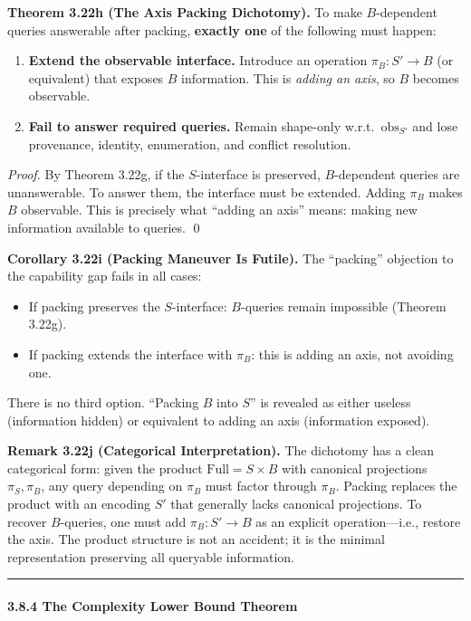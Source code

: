 \textbf{Theorem 3.22h (The Axis Packing Dichotomy).} To make $B$-dependent queries answerable after packing, \textbf{exactly one} of the following must happen:
\begin{enumerate}
\item \textbf{Extend the observable interface.} Introduce an operation $\pi_B : S' \to B$ (or equivalent) that exposes $B$ information. This is \emph{adding an axis}, so $B$ becomes observable.
\item \textbf{Fail to answer required queries.} Remain shape-only w.r.t.\ $\text{obs}_{S'}$ and lose provenance, identity, enumeration, and conflict resolution.
\end{enumerate}

\emph{Proof.} By Theorem 3.22g, if the $S$-interface is preserved, $B$-dependent queries are unanswerable. To answer them, the interface must be extended. Adding $\pi_B$ makes $B$ observable. This is precisely what ``adding an axis'' means: making new information available to queries. \qed

\textbf{Corollary 3.22i (Packing Maneuver Is Futile).} The ``packing'' objection to the capability gap fails in all cases:
\begin{itemize}
\item If packing preserves the $S$-interface: $B$-queries remain impossible (Theorem 3.22g).
\item If packing extends the interface with $\pi_B$: this is adding an axis, not avoiding one.
\end{itemize}

There is no third option. ``Packing $B$ into $S$'' is revealed as either useless (information hidden) or equivalent to adding an axis (information exposed).

\textbf{Remark 3.22j (Categorical Interpretation).} The dichotomy has a clean categorical form: given the product $\text{Full} = S \times B$ with canonical projections $\pi_S, \pi_B$, any query depending on $\pi_B$ must factor through $\pi_B$. Packing replaces the product with an encoding $S'$ that generally lacks canonical projections. To recover $B$-queries, one must add $\pi_B : S' \to B$ as an explicit operation---i.e., restore the axis. The product structure is not an accident; it is the minimal representation preserving all queryable information.

\begin{center}\rule{0.5\linewidth}{0.5pt}\end{center}

\paragraph{3.8.4 The Complexity Lower Bound
Theorem}\label{the-complexity-lower-bound-theorem}

